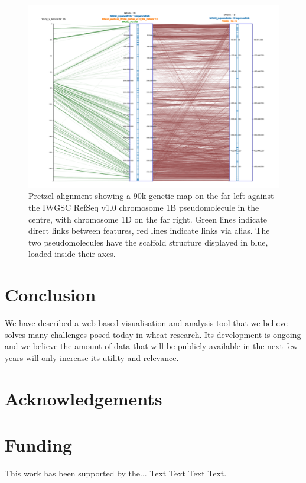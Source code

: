 \documentclass{bioinfo}
\begin{document}
\begin{figure}[!tpb]%
\centerline{\includegraphics[width=.55\textwidth]{pretzel.png}}
\caption{
  Pretzel alignment showing a 90k genetic map on the far left against the IWGSC RefSeq v1.0 chromosome 1B pseudomolecule in the centre, 
  with chromosome 1D on the far right. 
  Green lines indicate direct links between features, red lines indicate links via alias. 
  The two pseudomolecules have the scaffold structure displayed in blue, loaded inside their axes.
}
\label{fig:01}
\end{figure}




%
%






\section{Conclusion}

We have described a web-based visualisation and analysis tool that we believe solves many challenges posed today in wheat research. 
Its development is ongoing and we believe the amount of data that will be publicly available in the next few years will only increase its utility and relevance.

\section*{Acknowledgements}


\section*{Funding}

This work has been supported by the... Text Text  Text Text.\vspace*{-12pt}




\end{document}
